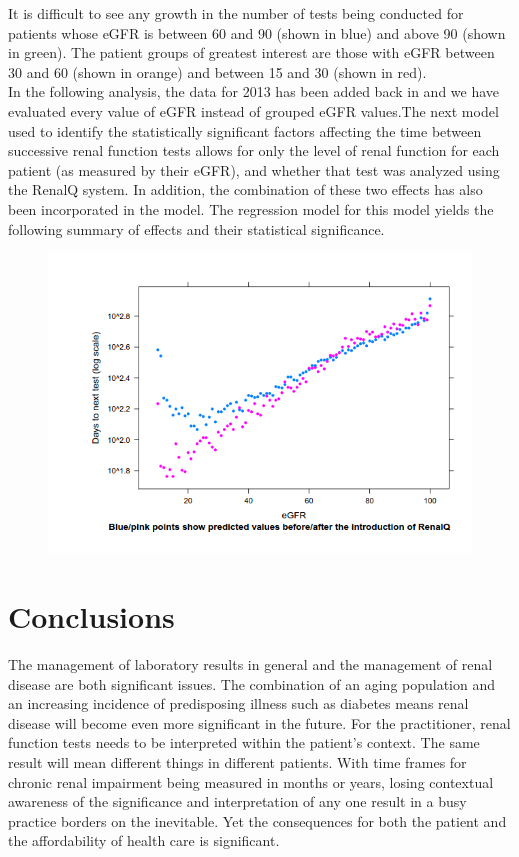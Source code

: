 \documentclass[11pt]{article}
\begin{document}
It is difficult to see any growth in the number of tests being conducted for patients whose eGFR is between 60 and 90 (shown in blue) and above 90 (shown in green). The patient groups of greatest interest are those with eGFR between 30 and 60 (shown in orange) and between 15 and 30 (shown in red).\\

In the following analysis, the data for 2013 has been added back in and we have evaluated every value of eGFR instead of grouped eGFR values.The next  model  used to identify the statistically significant factors affecting the time between successive renal function tests allows for only the level of renal function for each patient (as measured by their eGFR), and whether that test was analyzed using the RenalQ system. In addition, the combination of these two effects has also been incorporated in the model. The regression model for this model yields  the following summary of effects and their statistical significance. \\

\begin{figure}[htp]
\centering
\includegraphics[scale=0.50]{FigCritical.png}
\caption{}
\label{}
\end{figure}

\section{Conclusions}
The management of laboratory results in general and the management of renal disease are both significant issues. The combination of an aging population and an increasing incidence of predisposing illness such as diabetes means renal disease will become even more significant in the future. For the practitioner, renal function tests needs to be interpreted within the patient's context. The same result will mean different things in different patients. With time frames for chronic renal impairment being measured in months or years, losing contextual awareness of the significance and interpretation of any one result in a busy practice borders on the inevitable. Yet the consequences for both the patient and the affordability of health care is significant.\\
\end{document}
